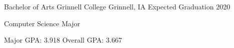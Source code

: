 \documentclass[12pt, a4paper]{awesome-cv}
\begin{document}
\makecvheader


\begin{cventries}
  \cventry
    {Bachelor of Arts}
    {Grinnell College}
    {Grinnell, IA}
    {Expected Graduation 2020}
    {
      \begin{cvitems}
	\item {Computer Science Major}
	\item {Major GPA: 3.918 \quad Overall GPA: 3.667}
      \end{cvitems}
    }
\end{cventries}
\end{document}
